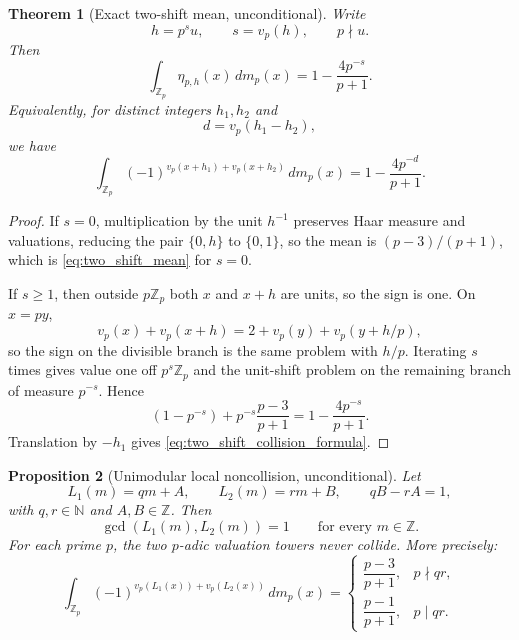 \documentclass[11pt]{amsart}
\numberwithin{equation}{section}
\theoremstyle{plain}
\newtheorem{theorem}{Theorem}[section]
\newtheorem{proposition}[theorem]{Proposition}
\theoremstyle{definition}
\theoremstyle{remark}
\newcommand{\N}{\mathbb N}
\newcommand{\Z}{\mathbb Z}
\begin{document}
\begin{theorem}[Exact two-shift mean, unconditional]
\label{thm:two_shift_mean}
Write
\begin{equation}
h=p^s u,
\qquad s=v_p(h),
\qquad p\nmid u.
\label{eq:h_factorization}
\end{equation}
Then
\begin{equation}
\int_{\Z_p}\eta_{p,h}(x)\,dm_p(x)
=1-\frac{4p^{-s}}{p+1}.
\label{eq:two_shift_mean}
\end{equation}
Equivalently, for distinct integers $h_1,h_2$ and
\begin{equation}
d=v_p(h_1-h_2),
\label{eq:collision_depth}
\end{equation}
we have
\begin{equation}
\int_{\Z_p}(-1)^{v_p(x+h_1)+v_p(x+h_2)}\,dm_p(x)
=1-\frac{4p^{-d}}{p+1}.
\label{eq:two_shift_collision_formula}
\end{equation}
\end{theorem}

\begin{proof}
If $s=0$, multiplication by the unit $h^{-1}$ preserves Haar measure and valuations, reducing the pair $\{0,h\}$ to $\{0,1\}$, so the mean is $(p-3)/(p+1)$, which is \eqref{eq:two_shift_mean} for $s=0$.

If $s\ge1$, then outside $p\Z_p$ both $x$ and $x+h$ are units, so the sign is one.  On $x=py$,
\begin{equation}
v_p(x)+v_p(x+h)=2+v_p(y)+v_p(y+h/p),
\label{eq:shift_recursion_valuation}
\end{equation}
so the sign on the divisible branch is the same problem with $h/p$.  Iterating $s$ times gives value one off $p^s\Z_p$ and the unit-shift problem on the remaining branch of measure $p^{-s}$.  Hence
\begin{equation}
(1-p^{-s})+p^{-s}\frac{p-3}{p+1}
=1-\frac{4p^{-s}}{p+1}.
\label{eq:two_shift_mean_proof}
\end{equation}
Translation by $-h_1$ gives \eqref{eq:two_shift_collision_formula}.
\end{proof}

\begin{proposition}[Unimodular local noncollision, unconditional]
\label{prop:unimodular_local}
Let
\begin{equation}
L_1(m)=qm+A,
\qquad
L_2(m)=rm+B,
\qquad
qB-rA=1,
\label{eq:unimodular_forms}
\end{equation}
with $q,r\in\N$ and $A,B\in\Z$.  Then
\begin{equation}
\gcd(L_1(m),L_2(m))=1
\qquad\text{for every }m\in\Z.
\label{eq:unimodular_value_coprimality}
\end{equation}
For each prime $p$, the two $p$-adic valuation towers never collide.  More precisely:
\begin{equation}
\int_{\Z_p}(-1)^{v_p(L_1(x))+v_p(L_2(x))}\,dm_p(x)
=
\begin{cases}
\dfrac{p-3}{p+1},&p\nmid qr,\\[2mm]
\dfrac{p-1}{p+1},&p\mid qr.
\end{cases}
\label{eq:unimodular_local_mean}
\end{equation}
\end{proposition}
\end{document}

